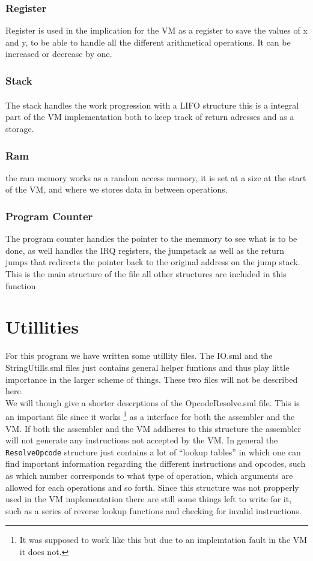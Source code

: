 \documentclass{article}
\newcommand{\V}{\verb}
\begin{document}
\subsubsection{Register}

Register is used in the implication for the VM as a 
register to save the values of x and y, to be able to 
handle all the different arithmetical operations. It can be increased or
decrease by one.

\subsubsection{Stack}
The stack handles the work progression with a LIFO\textsuperscript{\cite{lifo}}
structure this is a integral part of the VM implementation both to keep track of
return adresses and as a storage.

\subsubsection{Ram}
the ram memory works as a random access memory, it is set at a size 
at the start of the VM, and where we stores data in between operations.

\subsubsection{Program Counter}
The program counter handles the pointer to the memmory to see what is to be
done, as well handles the IRQ registers, the jumpstack as well as the
return jumps that redirects the pointer back to the original
address on the jump stack.
This is the main structure of the file all other structures are included in this
function

\section{Utillities}
For this program we have written some utillity files. The IO.sml and the
StringUtills.sml files just contains general helper funtions and thus play
little importance in the larger scheme of things. These two files will not be
described here.
\\
We will though give a shorter descrptions of the OpcodeResolve.sml file. This is
an important file since it works \footnote{It was supposed to work like this
but due to an implemtation fault in the VM it does not.} as a interface for both
the assembler and the VM. If both the assembler and the VM addheres to this
structure the assembler will not generate any instructions not accepted by the
VM. In general the \V+ResolveOpcode+ structure just contains a lot of ``lookup
tables'' in which one can find important information regarding the different
instructions and opcodes, such as which number corresponds to what type of operation, which 
arguments are allowed for each operations and so forth.
Since this structure was not propperly used in the VM implementation there are
still some things left to write for it, such as a series of reverse lookup
functions and checking for invalid instructions.
\end{document}
